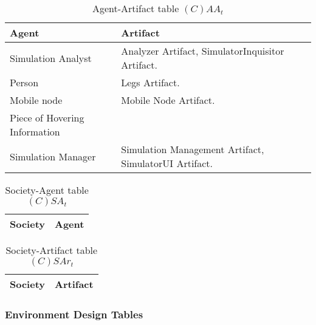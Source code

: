 \begin{table}[H]
	\centering
	\begin{tabular}{|p{4cm}|p{8cm}|}
			\hline
			\textbf{Agent} & \textbf{Artifact} \\
			\hline
			Simulation Analyst & Analyzer Artifact, SimulatorInquisitor Artifact. \\
			\hline
			Person & Legs Artifact. \\
			\hline
			Mobile node & Mobile Node Artifact. \\
			\hline
			Piece of Hovering Information & \\
			\hline
			Simulation Manager & Simulation Management Artifact, SimulatorUI
			Artifact. \\
			\hline
		\end{tabular}
	\caption{Agent-Artifact table $(C)AA_t$}
	\label{tab:caat}
\end{table}

\begin{table}[H]
	\centering
	\begin{tabular}{|p{4cm}|p{8cm}|}
			\hline
			\textbf{Society} & \textbf{Agent} \\
			\hline
			\hline
		\end{tabular}
	\caption{Society-Agent table $(C)SA_t$}
	\label{tab:csat}
\end{table}

\begin{table}[H]
	\centering
	\begin{tabular}{|p{4cm}|p{8cm}|}
			\hline
			\textbf{Society} & \textbf{Artifact} \\
			\hline
			\hline
		\end{tabular}
	\caption{Society-Artifact table $(C)SAr_t$}
	\label{tab:csart}
\end{table}

\subsubsection{Environment Design Tables}

